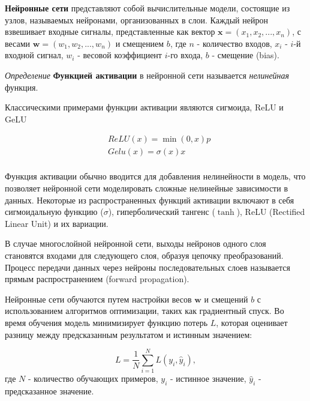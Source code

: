  \textbf{Нейронные сети} представляют собой вычислительные модели, состоящие из узлов, называемых нейронами, организованных в слои.
Каждый нейрон взвешивает входные сигналы,  представленные как вектор $\mathbf{x} = (x_1, x_2, ..., x_n)$, 
 с весами $\mathbf{w} = (w_1, w_2, ..., w_n)$ и смещением \( b \), 
 где \( n \) - количество входов, \( x_i \) - \( i \)-й входной сигнал,
  \( w_i \) - весовой коэффициент \( i \)-го входа, \( b \) - смещение (bias). 
  

\textit{Определение} \textbf{Функцией активации} в нейронной сети называется \textit{нелинейная} функция.

Классическими примерами функции активации являются сигмоида, ReLU \cite{agarap2018deep} и GeLU \cite{hendrycks2016gaussian}

\begin{multline}
  &ReLU(x) = \min(0,x)p \\
  &Gelu(x) = \sigma(x) x \\
\end{multline}

Функция активации обычно вводится для добавления нелинейности в модель, что позволяет нейронной сети моделировать сложные нелинейные зависимости в данных.
Некоторые из распространенных функций активации включают в себя сигмоидальную функцию (\( \sigma \)), гиперболический тангенс (\( \tanh \)), ReLU (Rectified Linear Unit) и их вариации.

В случае многослойной нейронной сети, выходы нейронов одного слоя становятся входами для следующего слоя, образуя цепочку преобразований. Процесс передачи данных через нейроны последовательных слоев называется прямым распространением (forward propagation).

Нейронные сети обучаются путем настройки весов \( \mathbf{w} \) и смещений \( b \) с использованием алгоритмов оптимизации, таких как градиентный спуск. 
Во время обучения модель минимизирует функцию потерь \( L \), которая оценивает разницу между предсказанным результатом и истинным значением:


\begin{equation}
  L = \frac{1}{N} \sum_{i=1}^{N} L(y_i, \hat{y}_i),
\end{equation}
где \( N \) - количество обучающих примеров, \( y_i \) - истинное значение, \( \hat{y}_i \) - предсказанное значение.